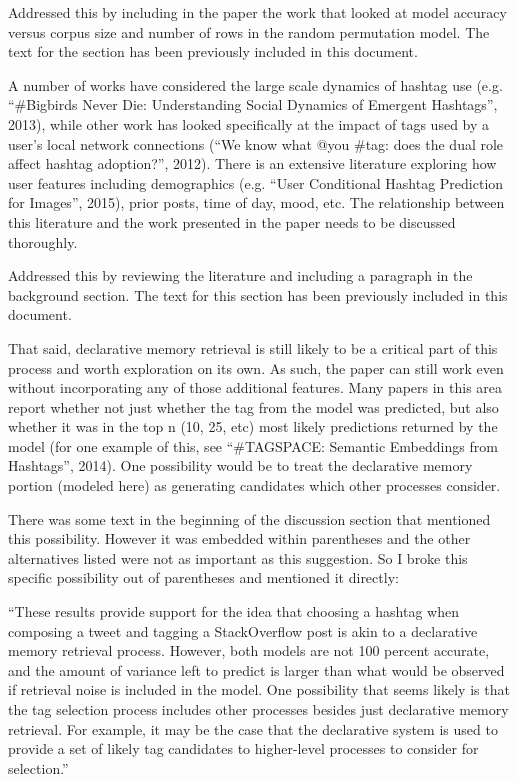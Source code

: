 \documentclass[answers,12pt]{exam}
\begin{document}
\begin{questions}
\begin{solution}
Addressed this by including in the paper the work that looked at model accuracy versus corpus size and number of rows in the random permutation model.
The text for the section has been previously included in this document.
\end{solution}

\question A number of works have considered the large scale dynamics of hashtag use (e.g. ``\#Bigbirds Never Die: Understanding Social Dynamics of Emergent Hashtags'', 2013), while other work has looked specifically at the impact of tags used by a user's local network connections (``We know what @you \#tag: does the dual role affect hashtag adoption?'', 2012). There is an extensive literature exploring how user features including demographics (e.g. ``User Conditional Hashtag Prediction for Images'', 2015), prior posts, time of day, mood, etc. The relationship between this literature and the work presented in the paper needs to be discussed thoroughly.

\begin{solution}
Addressed this by reviewing the literature and including a paragraph in the background section.
The text for this section has been previously included in this document.
\end{solution}

\question That said, declarative memory retrieval is still likely to be a critical part of this process and worth exploration on its own. As such, the paper can still work even without incorporating any of those additional features. Many papers in this area report whether not just whether the tag from the model was predicted, but also whether it was in the top n (10, 25, etc) most likely predictions returned by the model (for one example of this, see ``\#TAGSPACE: Semantic Embeddings from Hashtags'', 2014). One possibility would be to treat the declarative memory portion (modeled here) as generating candidates which other processes consider.

\begin{solution}

There was some text in the beginning of the discussion section that mentioned this possibility.
However it was embedded within parentheses and the other alternatives listed were not as important as this suggestion.
So I broke this specific possibility out of parentheses and mentioned it directly:

``These results provide support for the idea that choosing a hashtag when composing a tweet and tagging a StackOverflow post is akin to a declarative memory retrieval process. However, both models are not 100 percent accurate, and the amount of variance left to predict is larger than what would be observed if retrieval noise is included in the model. One possibility that seems likely is that the tag selection process includes other processes besides just declarative memory retrieval. For example, it may be the case that the declarative system is used to provide a set of likely tag candidates to higher-level processes to consider for selection.''

\end{solution}

\end{questions}
\end{document}

